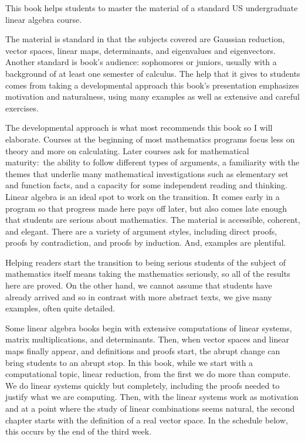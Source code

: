\thispagestyle{plain}
\setlength{\parskip}{.7ex}
\bigskip
\vspace*{1.35in}
\vspace*{.4in}
\par\noindent
This book helps students to master the material of a standard 
US undergraduate linear algebra course.

The material is standard in that the subjects covered are
Gaussian reduction, 
vector spaces, linear maps,
determinants, and eigenvalues and eigenvectors.
Another standard is book's audience:
sophomores or juniors, usually with a background 
of at least one semester of calculus. 
The help that it gives to students comes from taking a developmental 
approach\Dash 
this book's presentation emphasizes motivation and naturalness, 
using many examples as well as extensive and careful exercises.

The developmental approach is what most recommends this book
so I will elaborate.
Courses at the beginning of most mathematics programs
focus less on theory and more on calculating.
Later courses
ask for mathematical maturity:~the ability to follow different 
types of arguments, 
a familiarity with
the themes that underlie many mathematical investigations such as
elementary set and function facts,
and a capacity for some independent reading and thinking. 
Linear algebra is an ideal spot to work on the transition.
It comes early in a program so that progress made here pays off later,
but also comes late enough that
students are serious about mathematics.
The material is accessible, coherent, and elegant.
There are a variety of argument styles, including 
direct proofs, proofs by
contradiction, and proofs by induction.
And, examples are plentiful.

Helping readers start the transition to being serious students of 
the subject of mathematics itself
means taking the mathematics seriously, so
all of the results here are proved.
On the other hand, we cannot
assume that students have already arrived
and so 
in contrast with more abstract texts, 
we give many examples,
often quite detailed.

Some linear algebra books
begin with extensive computations of linear systems, 
matrix multiplications, 
and determinants.
Then, when 
vector spaces and linear maps finally appear, 
and definitions and proofs start, the abrupt change
can bring students to an abrupt stop.
In this book, while we start with
a computational topic, linear reduction, from the first
we do more than compute.
We do linear systems quickly but completely,
including the proofs needed to justify what we are computing.
Then, with the linear systems work as motivation
and at a point where the study of linear combinations seems natural,
the second chapter starts with the definition of a real vector space.
In the schedule below, this occurs by the end of the third week.

